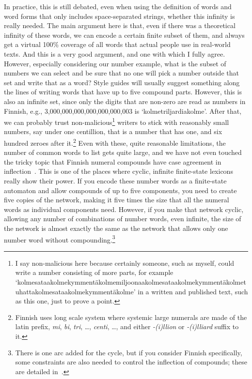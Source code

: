 \documentclass[officiallayout,final]{unihelcompling}
\begin{document}
In practice, this is still debated, even when using the definition of words and
word forms that only includes space-separated strings, whether this infinity is
really needed. The main argument here is that, even if there was a theoretical
infinity of these words, we can encode a certain finite subset of them, and
always get a virtual 100\% coverage of all words that actual people use in
real-world texts. And this is a very good argument, and one with which I fully
agree. However, especially considering our number example, what is the subset
of numbers we can select and be sure that no one will pick a number outside
that set and write that as a word? Style guides will usually suggest something
along the lines of writing words that have up to five compound parts.  However,
this is also an infinite set, since only the digits that are non-zero are read
as numbers in Finnish, e.g., 3,000,000,000,000,000,000,003 is
`kolmetriljardiakolme'. After that, we can probably trust
non-malicious\footnote{I say non-malicious here because certainly someone, such
    as myself, could write a number consisting of more parts, for example
    `kolmesataakolmekymmentäkolmemiljoonaakolmesataakolmekymmentäkolmetuhattakolmesataakolmekymmentäkolme'
in a written and published text, such as this one, just to prove a point.}
writers to stick with reasonably small numbers, say under one centillion, that
is a number that has one, and six hundred zeroes after it.\footnote{Finnish
    uses long scale system where systemic large numerals are made of the latin
    prefix, \emph{mi}, \emph{bi}, \emph{tri}, \ldots, \emph{centi}, \ldots, and
either \emph{-(i)llion} or \emph{-(i)lliard} suffix to it.} Even with these,
quite reasonable limitations, the number of common words to list gets quite
large, and we have not even touched the tricky topic that Finnish numeral
compounds have case agreement in inflection~\citep{karttunen2006numbers}. This
is one of the places where cyclic, infinite finite-state lexicons really show
their power.  If you encode these number words as a \gls{finite-state
automaton} and allow compounds of up to five components, you need to create
five copies of the network, making it five times the size that all the numeral
words as individual components need.  However, if you make that network cyclic,
allowing any number of combinations of number words, even infinite, the size of
the network is almost exactly the same as the network that allows only one
number word without compounding.\footnote{There is one arc added for the cycle,
but if you consider Finnish specifically, some constraints are also needed to
control the inflection of compounds; these are detailed
in~\citet{karttunen2006numbers}.}
\end{document}
